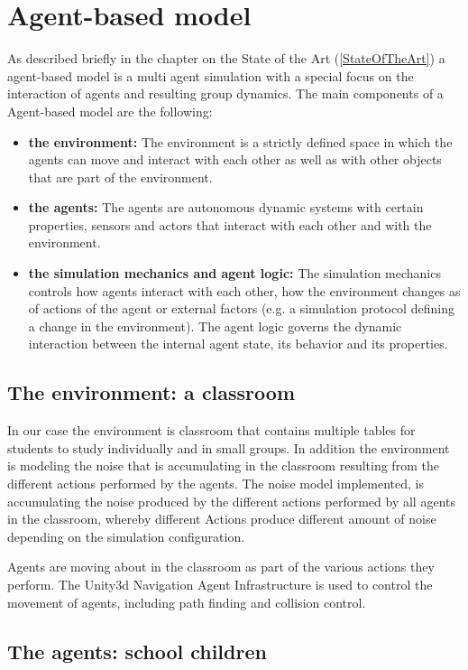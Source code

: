 \section{Agent-based model}
As described briefly in the chapter on the State of the Art (\ref{StateOfTheArt})
a agent-based model is a multi agent simulation with a special focus on the interaction
of agents and resulting group dynamics. The main components of a Agent-based
model are the following:

\begin{itemize}
    \item \textbf{the environment:} The environment is a strictly
    defined space in which the agents can move and interact with each other as 
    well as with other objects that are part of the environment. 
    \item \textbf{the agents:} The agents are autonomous dynamic systems with certain
    properties, sensors and actors that interact with each other and with the environment.
    \item \textbf{the simulation mechanics and agent logic:}  The simulation mechanics
    controls how agents interact with each other, how the environment changes
    as of actions of the agent or external factors (e.g. a simulation protocol defining
    a change in the environment). The agent logic governs the dynamic interaction between
    the internal agent state, its behavior and its properties.
\end{itemize}

\subsection{The environment: a classroom}
In our case the environment is classroom that contains multiple tables for
students to study individually and in small groups. In addition the environment
is modeling the noise that is accumulating in the classroom resulting from the
different actions performed by the agents. The noise model implemented, is
accumulating the noise produced by the different actions
performed by all agents in the classroom, whereby different Actions produce different
amount of noise depending on the simulation configuration.

Agents are moving about in the classroom as part of the various actions they perform.
The Unity3d Navigation Agent Infrastructure is used to control the movement of agents,
including path finding and collision control.

\label{agent}
\subsection{The agents: school children}

